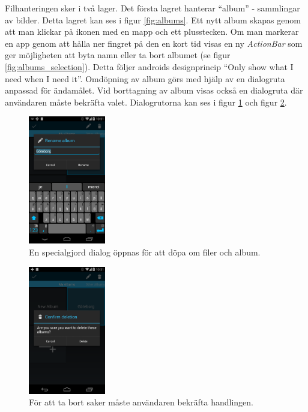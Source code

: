 \documentclass[11px, a4paper, twocolumn]{article}
\begin{document}
	Filhanteringen sker i två lager. Det första lagret hanterar ``album'' - sammlingar av bilder. Detta lagret kan ses i figur \ref{fig:albums}. Ett nytt album skapas genom att man klickar på ikonen med en mapp och ett plusstecken. Om man markerar en app genom att hålla ner fingret på den en kort tid visas en ny \emph{ActionBar}\cite{ContextActionBar} som ger möjligheten att byta namn eller ta bort albumet (se figur \ref{fig:albums_selection}). Detta följer androids designprincip ``Only show what I need when I need it''\cite{Principles}. Omdöpning av album görs med hjälp av en dialogruta anpassad för ändamålet. Vid borttagning av album visas också en dialogruta där användaren måste bekräfta valet\cite{Dialogs}. Dialogrutorna kan ses i figur \ref{fig:albums_selection_rename} och figur \ref{fig:albums_selection_delete}.

	\begin{figure}[p]
		\centering
	    \includegraphics[width=0.3\textwidth]{img/albums_selection_rename}
		\caption{\label{fig:albums_selection_rename}En specialgjord dialog öppnas för att döpa om filer och album.}
	\end{figure}

	\begin{figure}[p]
		\centering
	    \includegraphics[width=0.3\textwidth]{img/albums_selection_delete}
		\caption{\label{fig:albums_selection_delete}För att ta bort saker måste användaren bekräfta handlingen.}
	\end{figure}
\end{document}
